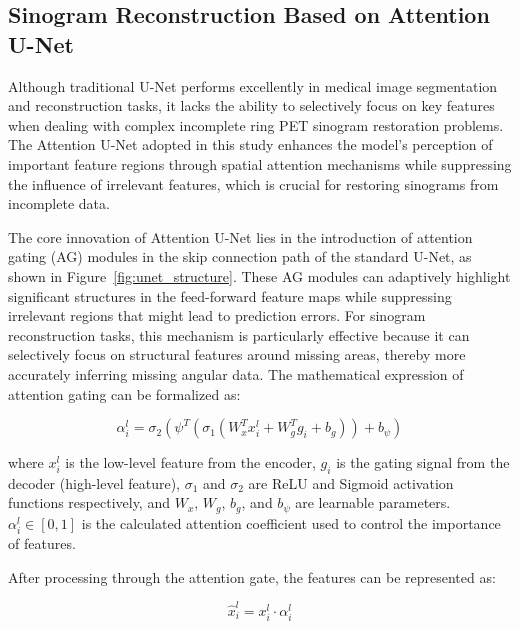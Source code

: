 \documentclass[
reprint,
superscriptaddress,
nofootinbib,
amsmath,amssymb,
aps,
prd,
]{revtex4-2}
\begin{document}


\subsection{Sinogram Reconstruction Based on Attention U-Net}

Although traditional U-Net performs excellently in medical image segmentation and reconstruction tasks, it lacks the ability to selectively focus on key features when dealing with complex incomplete ring PET sinogram restoration problems. The Attention U-Net adopted in this study enhances the model's perception of important feature regions through spatial attention mechanisms while suppressing the influence of irrelevant features, which is crucial for restoring sinograms from incomplete data.

The core innovation of Attention U-Net lies in the introduction of attention gating (AG) modules in the skip connection path of the standard U-Net, as shown in Figure~\ref{fig:unet_structure}. These AG modules can adaptively highlight significant structures in the feed-forward feature maps while suppressing irrelevant regions that might lead to prediction errors. For sinogram reconstruction tasks, this mechanism is particularly effective because it can selectively focus on structural features around missing areas, thereby more accurately inferring missing angular data. The mathematical expression of attention gating can be formalized as:

\begin{equation}
\alpha_i^l = \sigma_2(\psi^T(\sigma_1(W_x^T x_i^l + W_g^T g_i + b_g)) + b_\psi)
\end{equation}

where $x_i^l$ is the low-level feature from the encoder, $g_i$ is the gating signal from the decoder (high-level feature), $\sigma_1$ and $\sigma_2$ are ReLU and Sigmoid activation functions respectively, and $W_x$, $W_g$, $b_g$, and $b_\psi$ are learnable parameters. $\alpha_i^l \in [0,1]$ is the calculated attention coefficient used to control the importance of features.

After processing through the attention gate, the features can be represented as:

\begin{equation}
\hat{x}_i^l = x_i^l \cdot \alpha_i^l
\end{equation}
\end{document}
